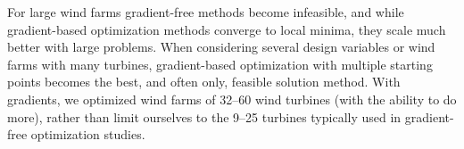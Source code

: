 For large wind farms gradient-free methods become infeasible, and while gradient-based optimization methods converge to local minima, they scale much better with large problems. %
When considering several design variables or wind farms with many turbines,
gradient-based optimization with multiple starting points becomes the best, and often only, feasible solution method. With gradients, we optimized wind farms of 32--60 wind turbines (with the ability to do more), rather than limit ourselves to the 9--25 turbines typically used in gradient-free optimization studies.%

